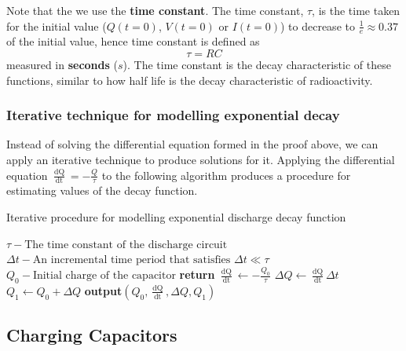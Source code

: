 Note that the we use the \textbf{time constant}. The time constant, $\tau$, is the time taken for the initial value ($Q(t = 0)$, $V(t = 0)$ or $I(t=0)$) to decrease to $\frac{1}{e} \approx 0.37$ of the initial value, hence time constant is defined as 
\begin{equation}
    \tau = RC
\end{equation}
measured in \textbf{seconds} ($s$). The time constant is the decay characteristic of these functions, similar to how half life is the decay characteristic of radioactivity. 

\subsubsection{Iterative technique for modelling exponential decay}

Instead of solving the differential equation formed in the proof above, we can apply an iterative technique to produce solutions for it. Applying the differential equation $\frac{\mathop{\mathrm{dQ}}}{\mathop{\mathrm{d}t}} = - \frac{Q}{\tau}$ to the following algorithm produces a procedure for estimating values of the decay function.

\begin{algorithm} 
    \caption{Iterative procedure for modelling exponential discharge decay function}
    \begin{algorithmic}[1]
        \Require $\tau - \text{The time constant of the discharge circuit}$
        \Require $\Delta t - \text{An incremental time period that satisfies } \Delta t \ll \tau$
        \Require $Q_0 - \text{Initial charge of the capacitor}$
                \State \textbf{return}
            \EndIf
            \State $\frac{\mathop{\mathrm{d}Q}}{\mathop{\mathrm{d}t}} \gets - \frac{Q_0}{\tau}$
            \State $\Delta Q \gets \frac{\mathop{\mathrm{d}Q}}{\mathop{\mathrm{d}t}} \Delta t$
            \State $Q_1 \gets Q_0 + \Delta Q$
            \State \textbf{output}$(Q_0, \frac{\mathop{\mathrm{d}Q}}{\mathop{\mathrm{d}t}}, \Delta Q, Q_1)$
            \State {}
        \EndProcedure 
    \end{algorithmic} 
\end{algorithm}
\FloatBarrier

\subsection{Charging Capacitors}

